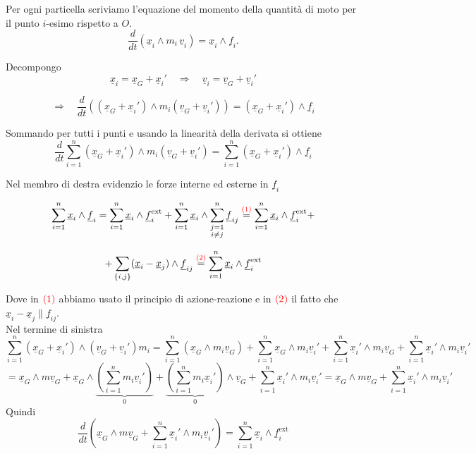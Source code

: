 Per ogni particella scriviamo l'equazione del momento della quantità di moto per il punto \(i\)-esimo rispetto a \(O\).
\[
\frac{d}{dt}\left(\underline{x}_i\wedge m_i\,\underline{v}_i\right)=\underline{x}_i\wedge \underline{f}_i.
\]

Decompongo
\[
\underline{x}_i=\underline{x}_G+\underline{x}_i'
\quad\Rightarrow\quad
\underline{v}_i=\underline{v}_G+\underline{v}_i'
\]

\[
\Rightarrow\quad
\frac{d}{dt}\left((\underline{x}_G+\underline{x}_i')\wedge m_i(\underline{v}_G+\underline{v}_i')\right)
=
(\underline{x}_G+\underline{x}_i')\wedge \underline{f}_i
\]

Sommando per tutti i punti e usando la linearità della derivata si ottiene
\[
\frac{d}{dt}\sum_{i=1}^{n}(\underline{x}_G+\underline{x}_i')\wedge m_i(\underline{v}_G+\underline{v}_i')
=
\sum_{i=1}^{n}(\underline{x}_G+\underline{x}_i')\wedge \underline{f}_i
\]

Nel membro di destra evidenzio le forze interne ed esterne in \(\underline{f}_i\)

\[
\sum_{i=1}^{n}\underline{x}_i\wedge \underline{f}_i
=
\sum_{i=1}^{n}\underline{x}_i\wedge \underline{f}_i^{\mathrm{ext}}
+
\sum_{i=1}^{n}\underline{x}_i\wedge \sum_{\substack{j=1\\ i\neq j}}^{n}\underline{f}_{ij}
\overset{\textcolor{red}{(1)}}{=}
\sum_{i=1}^{n}\underline{x}_i\wedge \underline{f}_i^{\mathrm{ext}}
+
\]

\[
+\sum_{\{i,j\}}(\underline{x}_i-\underline{x}_j)\wedge \underline{f}_{ij}
\overset{\textcolor{red}{(2)}}{=}
\sum_{i=1}^{n}\underline{x}_i\wedge \underline{f}_i^{\mathrm{ext}}
\]

Dove in \(\textcolor{red}{(1)}\) abbiamo usato il principio di azione-reazione e in \(\textcolor{red}{(2)}\) il fatto che \(\underline{x}_i-\underline{x}_j \parallel \underline{f}_{ij}\).\\
Nel termine di sinistra
\[
\sum_{i=1}^{n}(\underline{x}_G+\underline{x}_i')\wedge(\underline{v}_G+\underline{v}_i')m_i
=
\sum_{i=1}^{n}(\underline{x}_G\wedge m_i\underline{v}_G)
+
\sum_{i=1}^{n}\underline{x}_G\wedge m_i\underline{v}_i'
+
\sum_{i=1}^{n}\underline{x}_i'\wedge m_i\underline{v}_G
+
\sum_{i=1}^{n}\underline{x}_i'\wedge m_i\underline{v}_i'
\]
\[
=
\underline{x}_G\wedge m\underline{v}_G
+
\underline{x}_G\wedge\underbrace{\left(\sum_{i=1}^{n}m_i\underline{v}_i'\right)}_{0}
+
\underbrace{\left(\sum_{i=1}^{n}m_i\underline{x}_i'\right)}_{0}\wedge\underline{v}_G
+
\sum_{i=1}^{n}\underline{x}_i'\wedge m_i\underline{v}_i'
=
\underline{x}_G\wedge m\underline{v}_G
+
\sum_{i=1}^{n}\underline{x}_i'\wedge m_i\underline{v}_i'
\]
Quindi
\[
\frac{d}{dt}\left(\underline{x}_G\wedge m\underline{v}_G+\sum_{i=1}^{n}\underline{x}_i'\wedge m_i\underline{v}_i'\right)
=
\sum_{i=1}^{n}\underline{x}_i\wedge \underline{f}_i^{\mathrm{ext}}
\]

